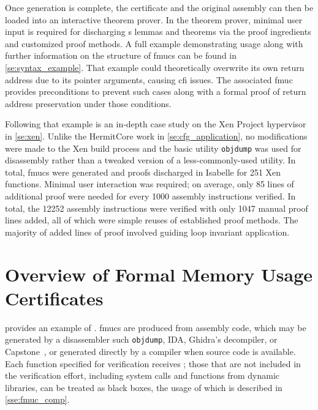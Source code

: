 
Once generation is complete, the certificate and the original assembly%
can then be loaded into an interactive theorem prover.
In the theorem prover,
minimal user input is required for discharging s lemmas and theorems
via the proof ingredients and customized proof methods.%
%
A full example demonstrating usage along with 
further information on the structure of \acp{fmuc}
can be found in \cref{se:syntax_example}.
That example could theoretically overwrite
its own return address due to its pointer arguments, causing \ac{cfi} issues.
The associated \ac{fmuc} provides preconditions to prevent such cases
along with a formal proof of return address preservation under those conditions.

Following that example is an in-depth case study
on the Xen Project hypervisor~\citep{chisnall2008definitive} in \cref{se:xen}.
Unlike the HermitCore work in \cref{se:cfg_application},
no modifications were made to the Xen build process
and the basic utility \texttt{objdump} was used for disassembly
rather than a tweaked version of a less-commonly-used utility.
In total, \acp{fmuc} were generated and proofs discharged in Isabelle
for 251 Xen functions.
Minimal user interaction was required;
on average, only \num{85} lines of additional proof were needed
for every \num{1000} assembly instructions verified.
In total, the \num{12252} assembly instructions
were verified with only \num{1047} manual proof lines added,
all of which were simple reuses of established proof methods.
The majority of added lines of proof involved guiding loop invariant application.

\section{Overview of Formal Memory Usage Certificates}\label{se:fmuc_overview}
 provides an example of .
\Acp{fmuc} are produced from assembly code,
which may be generated by a disassembler such \texttt{objdump},
IDA,
Ghidra's decompiler, or Capstone~\citep{capstone},
or generated directly by a compiler when source code is available.
Each function specified for verification receives ;
those that are not included in the verification effort,%
including system calls and functions from dynamic libraries,
can be treated as black boxes,
the usage of which is described in \cref{sse:fmuc_comp}.


